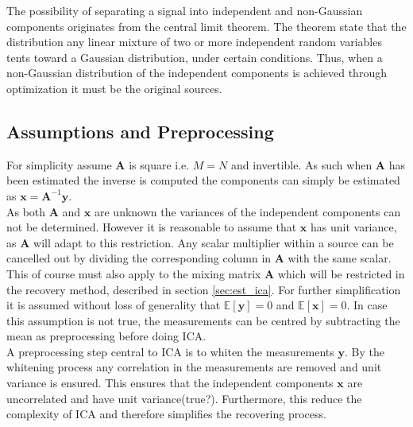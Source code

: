 The possibility of separating a signal into independent and non-Gaussian components originates from the central limit theorem\cite[p. 34]{ICA}. The theorem state that the distribution any linear mixture of two or more independent random variables tents toward a Gaussian distribution, under certain conditions. Thus, when a non-Gaussian distribution of the independent components is achieved through optimization it must be the original sources.

\subsection{Assumptions and Preprocessing}
For simplicity assume $\textbf{A}$ is square i.e. $M=N$ and invertible. As such when $\textbf{A}$ has been estimated the inverse is computed the components can simply be estimated as $\textbf{x}=\textbf{A}^{-1}\textbf{y}$\cite[p. 152-153]{ICA}.
\\ 
As both $\textbf{A}$ and $\textbf{x}$ are unknown the variances of the independent components can not be determined. However it is reasonable to assume that $\mathbf{x}$ has unit variance, as $\textbf{A}$ will adapt to this restriction. Any scalar multiplier within a source can be cancelled out by dividing the corresponding column in $\textbf{A}$ with the same scalar.\\  
This of course must also apply to the mixing matrix $\mathbf{A}$ which will be restricted in the recovery method, described in section \ref{sec:est_ica}.
For further simplification it is assumed without loss of generality that $\mathbb{E}[\mathbf{y}] = 0$ and $\mathbb{E}[\mathbf{x}] = 0$\cite[p. 154]{ICA}. In case this assumption is not true, the measurements can be centred by subtracting the mean as preprocessing before doing ICA.\\
A preprocessing step central to ICA is to whiten the measurements $\mathbf{y}$. By the whitening process any correlation in the measurements are removed and unit variance is ensured. This ensures that the independent components $\mathbf{x}$ are uncorrelated and have unit variance(true?). Furthermore, this reduce the complexity of ICA and therefore simplifies the recovering process.
